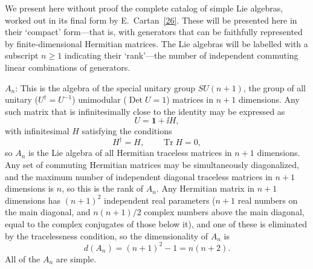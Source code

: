 

We present here without proof the complete catalog of simple Lie algebras,
worked out in its final form by E.~Cartan~\hyperref[ch15-ref-26]{[26]}. These will
be presented here in their `compact' form---that is, with generators that can be
faithfully represented by finite-dimensional Hermitian matrices. The Lie algebras
will be labelled with a subscript $n\geq1$ indicating their `rank'---the number of
independent commuting linear combinations of generators.

\noindent
$A_n$: This is the algebra of the special unitary group $SU(n+1)$, the group of
all unitary ($U^\dagger=U^{-1}$) unimodular ($\operatorname{Det}U=1$) matrices in
$n+1$ dimensions. Any such matrix that is infinitesimally close to the identity
may be expressed as
\[
 U=\mathbf{1}+\ii H ,
\]
with infinitesimal $H$ satisfying the conditions
\[
 H^\dagger=H,\qquad \operatorname{Tr}H=0 ,
\]
so $A_n$ is the Lie algebra of all Hermitian traceless matrices in $n+1$
dimensions. Any set of commuting Hermitian matrices may be simultaneously
diagonalized, and the maximum number of independent diagonal traceless matrices
in $n+1$ dimensions is $n$, so this is the rank of $A_n$. Any Hermitian matrix in
$n+1$ dimensions has $(n+1)^2$ independent real parameters ($n+1$ real numbers
on the main diagonal, and $n(n+1)/2$ complex numbers above the main diagonal,
equal to the complex conjugates of those below it), and one of these is eliminated
by the tracelessness condition, so the dimensionality of $A_n$ is
\[
 d(A_n)=(n+1)^2-1=n(n+2) .
\]
All of the $A_n$ are simple.

